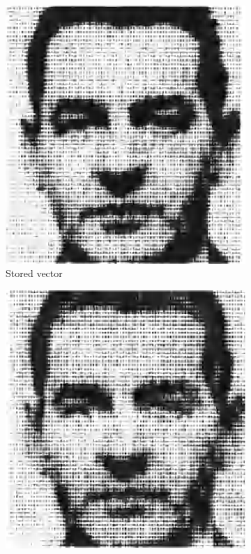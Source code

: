 \documentclass{article}
\begin{document}
\begin{figure}[htbp]
     \centering
     \begin{subfigure}[t]{0.3\textwidth}
         \centering
         \includegraphics[width=\textwidth]{img/kohonenA.png}
         \caption{Stored vector}
         \label{kohonen2A}
     \end{subfigure}
     \hfill
     \begin{subfigure}[t]{0.3\textwidth}
         \centering
         \includegraphics[width=\textwidth]{img/kohonenC.png}

\end{subfigure}
\end{figure}
\end{document}

